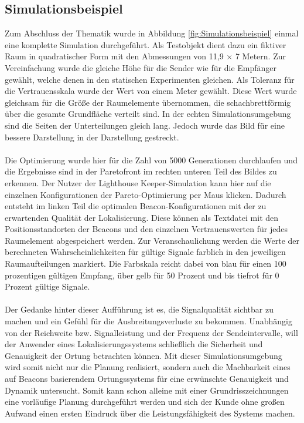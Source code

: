 \subsection{Simulationsbeispiel}\label{sec:Simulationsbeispiel}
Zum Abschluss der Thematik wurde in Abbildung \ref{fig:Simulationsbeispiel} einmal eine komplette Simulation durchgeführt. Als Testobjekt dient dazu ein fiktiver Raum in quadratischer Form mit den Abmessungen von 11,9 $\times$ 7 Metern. Zur Vereinfachung wurde die gleiche Höhe für die Sender wie für die Empfänger gewählt, welche denen in den statischen Experimenten gleichen. Als Toleranz für die Vertrauensskala wurde der Wert von einem Meter gewählt. Diese Wert wurde gleichsam für die Größe der Raumelemente übernommen, die schachbrettförmig über die gesamte Grundfläche verteilt sind. In der echten Simulationsumgebung sind die Seiten der Unterteilungen gleich lang. Jedoch wurde das Bild für eine bessere Darstellung in der Darstellung gestreckt. \\ \\
Die Optimierung wurde hier für die Zahl von 5000 Generationen durchlaufen und die Ergebnisse sind in der Paretofront im rechten unteren Teil des Bildes zu erkennen. Der Nutzer der Lighthouse Keeper-Simulation kann hier auf die einzelnen Konfigurationen der Pareto-Optimierung per Maus klicken. Dadurch entsteht im linken Teil die optimalen Beacon-Konfigurationen mit der zu erwartenden Qualität der Lokalisierung. Diese können als Textdatei mit den Positionsstandorten der Beacons und den einzelnen Vertrauenswerten für jedes Raumelement abgespeichert werden. Zur Veranschaulichung werden die Werte der berechneten Wahrscheinlichkeiten für gültige Signale farblich in den jeweiligen Raumaufteilungen markiert. Die Farbskala reicht dabei von blau für einen 100 prozentigen gültigen Empfang, über gelb für 50 Prozent und bis tiefrot für 0 Prozent gültige Signale. \\ \\
Der Gedanke hinter dieser Aufführung ist es, die Signalqualität sichtbar zu machen und ein Gefühl für die Ausbreitungsverluste zu bekommen. Unabhängig von der Reichweite bzw. Signalleistung und der Frequenz der Sendeintervalle, will der Anwender eines Lokalisierungssystems schließlich die Sicherheit und Genauigkeit der Ortung betrachten können. Mit dieser Simulationsumgebung wird somit nicht nur die Planung realisiert, sondern auch die Machbarkeit eines auf Beacons basierendem Ortungssystems für eine erwünschte Genauigkeit und Dynamik untersucht. Somit kann schon alleine mit einer Grundrisszeichnungen eine vorläufige Planung durchgeführt werden und sich der Kunde ohne großen Aufwand einen ersten Eindruck über die Leistungsfähigkeit des Systems machen. 
